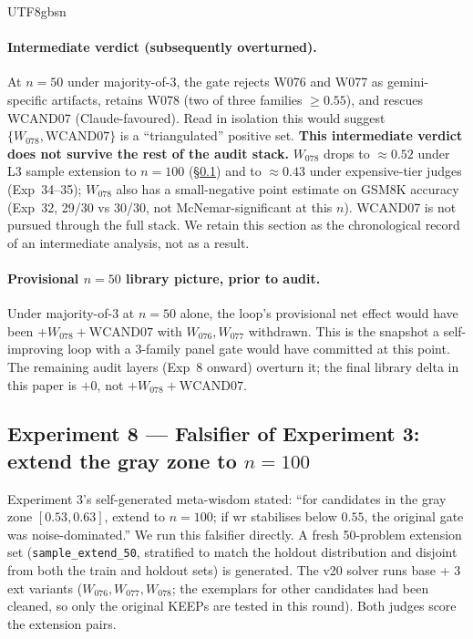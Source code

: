 \documentclass{article}
\begin{document}
\begin{CJK*}{UTF8}{gbsn}
\paragraph{Intermediate verdict (subsequently overturned).} At
\(n = 50\) under majority-of-3, the gate rejects W076 and W077 as
gemini-specific artifacts, retains W078 (two of three families
\(\geq 0.55\)), and rescues WCAND07 (Claude-favoured). Read in
isolation this would suggest \(\{W_{078}, \text{WCAND07}\}\) is a
``triangulated'' positive set. \textbf{This intermediate verdict
does not survive the rest of the audit stack.} \(W_{078}\) drops
to \(\approx 0.52\) under L3 sample extension to \(n = 100\)
(\S\ref{sec:exp8}) and to \(\approx 0.43\) under expensive-tier
judges (Exp~34--35); \(W_{078}\) also has a small-negative point
estimate on GSM8K accuracy (Exp~32, 29/30 vs 30/30, not
McNemar-significant at this \(n\)). WCAND07 is not pursued through the full stack.
We retain this section as the chronological record of an
intermediate analysis, not as a result.

\paragraph{Provisional \(n = 50\) library picture, prior to
audit.} Under majority-of-3 at \(n = 50\) alone, the loop's
provisional net effect would have been
\(+W_{078} + \text{WCAND07}\) with \(W_{076}, W_{077}\) withdrawn.
This is the snapshot a self-improving loop with a 3-family panel
gate would have committed at this point. The remaining audit
layers (Exp~8 onward) overturn it; the final library delta in
this paper is \(+0\), not \(+W_{078} + \text{WCAND07}\).

\subsection{Experiment 8 — Falsifier of Experiment 3: extend the
gray zone to \(n = 100\)}
\label{sec:exp8}

Experiment 3's self-generated meta-wisdom stated: ``for candidates
in the gray zone \([0.53, 0.63]\), extend to \(n = 100\); if
\(\text{wr}\) stabilises below \(0.55\), the original gate was
noise-dominated.'' We run this falsifier directly. A fresh
50-problem extension set (\texttt{sample\_extend\_50}, stratified
to match the holdout distribution and disjoint from both the
train and holdout sets) is generated. The v20 solver runs base +
3 ext variants (\(W_{076}, W_{077}, W_{078}\); the exemplars for
other candidates had been cleaned, so only the original KEEPs
are tested in this round). Both judges score the extension pairs.


\end{CJK*}
\end{document}

